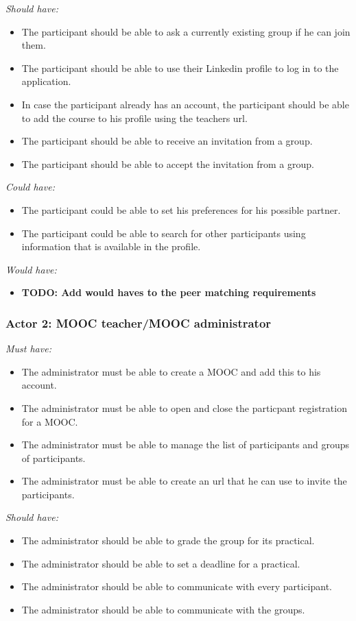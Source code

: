 \documentclass[]{article}
\newcommand{\TODO}[1]{{\color{red}\textbf{TODO: #1}}}
\newcommand{\reqr}[1]{{\noindent\emph{#1:}}}
\begin{document}
\reqr{Should have}
\begin{itemize}
\item The participant should be able to ask a currently existing group if he can join them.
\item The participant should be able to use their Linkedin profile to log in to the application.
\item In case the participant already has an account, the participant should be able to add the course to his profile using the teachers url.
\item The participant should be able to receive an invitation from a group.
\item The participant should be able to accept the invitation from a group.
\end{itemize}

\reqr{Could have}
\begin{itemize}
\item The participant could be able to set his preferences for his possible partner.
\item The participant could be able to search for other participants using information that is available in the profile.
\end{itemize}

\reqr{Would have}
\begin{itemize}
\item \TODO{Add would haves to the peer matching requirements}
\end{itemize}


\subsubsection{Actor 2: MOOC teacher/MOOC administrator}
\reqr{Must have}
\begin{itemize}
\item The administrator must be able to create a MOOC and add this to his account.
\item The administrator must be able to open and close the particpant registration for a MOOC.
\item The administrator must be able to manage the list of participants and groups of participants.
\item The administrator must be able to create an url that he can use to invite the participants.
\end{itemize}

\reqr{Should have}
\begin{itemize}
\item The administrator should be able to grade the group for its practical.
\item The administrator should be able to set a deadline for a practical.
\item The administrator should be able to communicate with every participant.
\item The administrator should be able to communicate with the groups.
\end{itemize}
\end{document}
